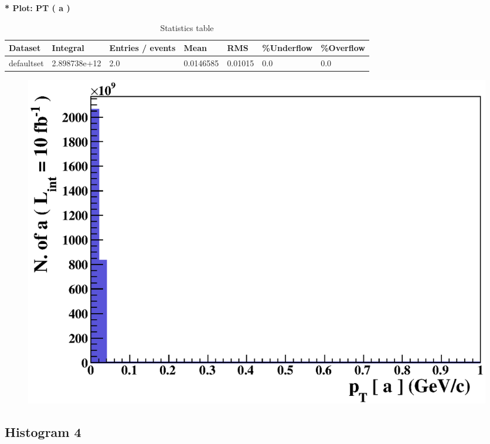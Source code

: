 \documentclass[a4paper, 11pt]{article}
\begin{document}
   \textbf{   * Plot: PT ( a ) }
\textbf{ }\begin{table}[!h]
  \begin{center}
    \caption{ Statistics table}
    \begin{tabular}{|m{17.0mm}|m{27.0mm}|m{23.0mm}|m{18.0mm}|m{18.0mm}|m{14.0mm}|m{14.0mm}|}
      \hline
      \cellcolor{yellow}         Dataset& \cellcolor{yellow}         Integral& \cellcolor{yellow}         Entries /\- events& \cellcolor{yellow}         Mean& \cellcolor{yellow}         RMS& \cellcolor{yellow}         \%Underflow& \cellcolor{yellow}         \%Overflow\\
      \hline
      \cellcolor{white}         defaultset& \cellcolor{white}         2.898738e+12& \cellcolor{white}         2.0& \cellcolor{white}         0.0146585& \cellcolor{white}         0.01015& \cellcolor{green}         0.0& \cellcolor{green}         0.0\\
\hline
    \end{tabular}
  \end{center}
\end{table}

\begin{figure}[!h]
  \begin{center}
    \includegraphics[scale=0.6]{selection_2.eps}\\
\caption{}
  \end{center}
\end{figure}
\newpage
   \newpage
\subsection{ Histogram 4}
\end{document}
